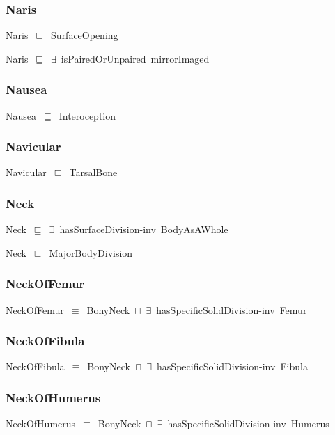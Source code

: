 \documentclass{article}
\begin{document}
\subsubsection*{Naris}

Naris~\ensuremath{\sqsubseteq}~SurfaceOpening~

Naris~\ensuremath{\sqsubseteq}~\ensuremath{\exists}~isPairedOrUnpaired~mirrorImaged~

\subsubsection*{Nausea}

Nausea~\ensuremath{\sqsubseteq}~Interoception~

\subsubsection*{Navicular}

Navicular~\ensuremath{\sqsubseteq}~TarsalBone~

\subsubsection*{Neck}

Neck~\ensuremath{\sqsubseteq}~\ensuremath{\exists}~hasSurfaceDivision-inv~BodyAsAWhole~

Neck~\ensuremath{\sqsubseteq}~MajorBodyDivision~

\subsubsection*{NeckOfFemur}

NeckOfFemur~\ensuremath{\equiv}~BonyNeck~\ensuremath{\sqcap}~\ensuremath{\exists}~hasSpecificSolidDivision-inv~Femur

\subsubsection*{NeckOfFibula}

NeckOfFibula~\ensuremath{\equiv}~BonyNeck~\ensuremath{\sqcap}~\ensuremath{\exists}~hasSpecificSolidDivision-inv~Fibula

\subsubsection*{NeckOfHumerus}

NeckOfHumerus~\ensuremath{\equiv}~BonyNeck~\ensuremath{\sqcap}~\ensuremath{\exists}~hasSpecificSolidDivision-inv~Humerus
\end{document}
